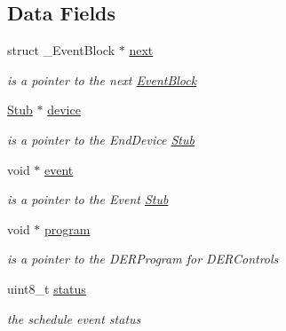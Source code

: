 \subsection*{Data Fields}
\begin{DoxyCompactItemize}
\item 
\mbox{\label{structEventBlock_a681d92c984804b2eaf72a5a9841cb7d9}} 
struct \+\_\+\+Event\+Block $\ast$ \hyperlink{structEventBlock_a681d92c984804b2eaf72a5a9841cb7d9}{next}
\begin{DoxyCompactList}\small\item\em is a pointer to the next \hyperlink{structEventBlock}{Event\+Block} \end{DoxyCompactList}\item 
\mbox{\label{structEventBlock_a529c411c181e43ce96c1ae4ff1adb354}} 
\hyperlink{structStub}{Stub} $\ast$ \hyperlink{structEventBlock_a529c411c181e43ce96c1ae4ff1adb354}{device}
\begin{DoxyCompactList}\small\item\em is a pointer to the End\+Device \hyperlink{structStub}{Stub} \end{DoxyCompactList}\item 
\mbox{\label{structEventBlock_aee1d8030865b3cb2a3dafebfe167e8d3}} 
void $\ast$ \hyperlink{structEventBlock_aee1d8030865b3cb2a3dafebfe167e8d3}{event}
\begin{DoxyCompactList}\small\item\em is a pointer to the Event \hyperlink{structStub}{Stub} \end{DoxyCompactList}\item 
\mbox{\label{structEventBlock_af4881ab7d86bb9d46c0f13fa02469f72}} 
void $\ast$ \hyperlink{structEventBlock_af4881ab7d86bb9d46c0f13fa02469f72}{program}
\begin{DoxyCompactList}\small\item\em is a pointer to the D\+E\+R\+Program for D\+E\+R\+Controls \end{DoxyCompactList}\item 
\mbox{\label{structEventBlock_a7ec65a162162bfdb2aa61b13ca5e38ab}} 
uint8\+\_\+t \hyperlink{structEventBlock_a7ec65a162162bfdb2aa61b13ca5e38ab}{status}
\begin{DoxyCompactList}\small\item\em the schedule event status \end{DoxyCompactList}\item 

\end{DoxyCompactItemize}
